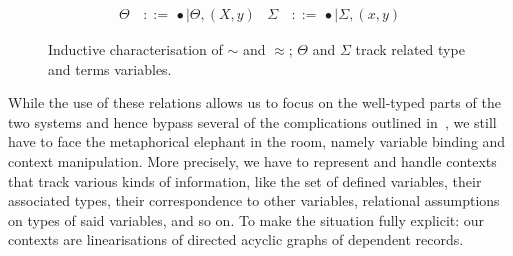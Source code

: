 \documentclass[a4paper,UKenglish]{lipics-v2016}
\newcommand{\ms}{\,}
\newcommand{\mrel}[1]{\mathrel{\ms #1 \ms}}
\newcommand{\bnfdef}{\mrel{::=}}
\newcommand{\of}{\ensuremath{\!:\!}}
\newcommand{\cc}[2]{#1;#2} %
\newcommand{\tyr}{\mathrel{\sim}}
\newcommand{\tmr}{\mathrel{\approx}}
\newcommand{\Prp}{\ensuremath{\textrm{\textasteriskcentered}}}
\newcommand{\nAll}[1]{\ensuremath{\forall #1.\,}}
\newcommand{\Lam}[1]{\ensuremath{\lambda #1.\,}}
\newcommand{\nTyLam}[1]{\ensuremath{\Lambda #1.\,}}
\newcommand{\Prod}[1]{\ensuremath{\Pi #1.\,}}
\newcommand{\emptyctx}{\ensuremath{\bullet}}
\begin{document}
\begin{figure}[t]
  \begin{center}
    \begin{align*}
      \Theta &\bnfdef \emptyctx \mid \Theta, (X,y) & \Sigma &\bnfdef \emptyctx \mid \Sigma, (x,y)
    \end{align*}
  \end{center}
  \caption{Inductive characterisation of $\tyr$ and $\tmr$; $\Theta$ and $\Sigma$ track related type and terms variables.}
  \label{fig:rel}
\end{figure}

While the use of these relations allows us to focus on the well-typed parts of the two systems and hence bypass several of the complications outlined in~\cite{KaiserEtAl:2017:sysf_pts_equiv_coq}, we still have to face the metaphorical elephant in the room, namely variable binding and context manipulation.
More precisely, we have to represent and handle contexts that track various kinds of information, like the set of defined variables, their associated types, their correspondence to other variables, relational assumptions on types of said variables, and so on.
To make the situation fully explicit: our contexts are linearisations of directed acyclic graphs of dependent records.
\end{document}
